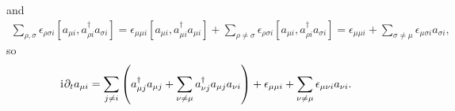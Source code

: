 \documentclass[nofootinbib,notitlepage,11pt]{revtex4-2}
\newcommand{\p}[1]{\left(#1\right)} %
\renewcommand{\sp}[1]{\left[#1\right]} %
\renewcommand{\d}{\partial} %
\renewcommand{\i}{\mathrm{i}\mkern1mu} %
\newcommand{\1}{\mathds{1}}
\begin{document}
and
\begin{align}
  \sum_{\rho,\sigma} \epsilon_{\rho\sigma i}
  \sp{a_{\mu i}, a_{\rho i}^\dag a_{\sigma i}}
  = \epsilon_{\mu\mu i}
  \sp{a_{\mu i}, a_{\mu i}^\dag a_{\mu i}}
  + \sum_{\rho\ne\sigma} \epsilon_{\rho\sigma i}
  \sp{a_{\mu i}, a_{\rho i}^\dag a_{\sigma i}}
  = \epsilon_{\mu\mu i}
  + \sum_{\sigma\ne\mu} \epsilon_{\mu\sigma i} a_{\sigma i},
\end{align}
so
\begin{align}
  \i \d_t a_{\mu i}
  = \sum_{j\ne i} \p{a_{\mu j}^\dag a_{\mu j}
  + \sum_{\nu\ne\mu} a_{\nu j}^\dag a_{\mu j} a_{\nu i}}
  + \epsilon_{\mu\mu i}
  + \sum_{\nu\ne\mu} \epsilon_{\mu\nu i} a_{\nu i}.
\end{align}


\end{document}
